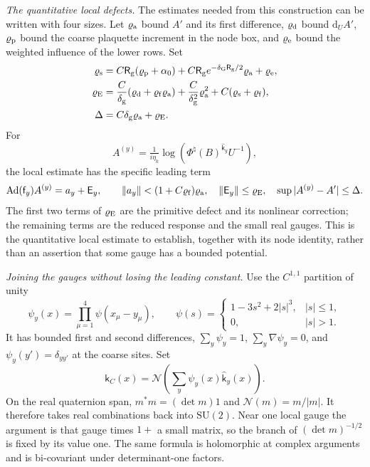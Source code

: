 \documentclass[11pt,letterpaper,reqno]{amsart}
\theoremstyle{definition}
\theoremstyle{remark}
\newcommand{\SU}{\mathrm{SU}}
\begin{document}
\emph{The quantitative local defects.}
The estimates needed from this construction can be
written with four sizes. Let \(\varrho_{\rm a}\)
bound \(A'\) and its first difference,
\(\varrho_{\rm d}\) bound \(\mathrm d_UA'\),
\(\varrho_{\rm p}\) bound the coarse plaquette
increment in the node box, and
\(\varrho_{\rm e}\) bound the weighted influence
of the lower rows. Set
\begin{align*}
 \varrho_{\rm s}={}&
 C\mathsf R_{\rm g}(\varrho_{\rm p}+\alpha_0)
 +C\mathsf R_{\rm g}e^{-\delta_{\mathrm G}\mathsf R_{\rm g}/2}
                                            \varrho_{\rm a}
 +\varrho_{\rm e},\\
 \varrho_{\rm E}={}&
 \frac C{\delta_{\rm g}}
       (\varrho_{\rm d}+\varrho_{\rm f}\varrho_{\rm a})
 +\frac C{\delta_{\rm g}^2}\varrho_{\rm a}^2
 +C(\varrho_{\rm s}+\varrho_{\rm f}),\\
 \Delta={}&C\delta_{\rm g}\varrho_{\rm a}+\varrho_{\rm E}.
\end{align*}
For
\[
 A^{(y)}=\tfrac1{i\eta_k}
           \log(\Phi^\natural(B)^{\widehat{\mathsf k}_y}U^{-1}),
\]
the local estimate has the specific leading term
\begin{equation}\label{eq:generated-local-defect}
 \operatorname{Ad}(\mathsf f_y)A^{(y)}
       =a_y+\mathsf E_y,\qquad
 \|a_y\|<(1+C\varrho_{\rm f})\varrho_{\rm a},
 \quad \|\mathsf E_y\|\le\varrho_{\rm E},
 \quad \sup|A^{(y)}-A'|\le\Delta .
\end{equation}
The first two terms of \(\varrho_{\rm E}\) are
the primitive defect and its nonlinear correction;
the remaining terms are the reduced response and
the small real gauges. This is the quantitative
local estimate to establish, together with its
node identity, rather than an assertion that
some gauge has a bounded potential.

\emph{Joining the gauges without losing the leading constant.}
Use the \(C^{1,1}\) partition of unity
\[
 \psi_y(x)=\prod_{\mu=1}^4\psi(x_\mu-y_\mu),\qquad
 \psi(s)=
 \begin{cases}
 1-3s^2+2|s|^3,&|s|\le1,\\
 0,&|s|>1.
 \end{cases}
\]
It has bounded first and second differences,
\(\sum_y\psi_y=1\), \(\sum_y\nabla\psi_y=0\), and
\(\psi_y(y')=\delta_{yy'}\) at the coarse sites.
Set
\begin{equation}\label{eq:xrg-quaternion-gauge}
 \mathsf k_C(x)=\mathcal N\left(
                         \sum_y\psi_y(x)\widehat{\mathsf k}_y(x)\right).
\end{equation}
On the real quaternion span,
\(m^*m=(\det m)1\) and \(\mathcal N(m)=m/|m|\).
It therefore takes real combinations back into
\(\SU(2)\). Near one local gauge the argument
is that gauge times \(1+\) a small matrix, so
the branch of \((\det m)^{-1/2}\) is fixed
by its value one. The same formula is
holomorphic at complex arguments and is
bi-covariant under determinant-one factors.
\end{document}

